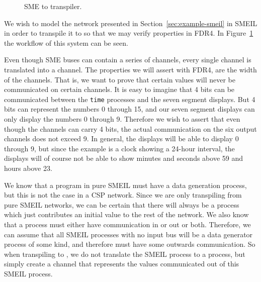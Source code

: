 \begin{figure}[!ht]
  \centering
  \caption{SME to \cspm{} transpiler.}
  \label{fig:sme-to-cspm}
\end{figure}

We wish to model the network presented in Section~\ref{sec:example-smeil} in SMEIL in order to transpile it to \cspm{} so that we may verify properties in FDR4. In Figure~\ref{fig:sme-to-cspm} the workflow of this system can be seen.

Even though SME buses can contain a series of channels, every single channel is translated into a \cspm{} channel. The properties we will assert with FDR4, are the width of the \cspm{} channels. That is, we want to prove that certain values will never be communicated on certain channels.
It is easy to imagine that 4 bits can be communicated between the \texttt{time} processes and the seven segment displays. But 4 bits can represent the numbers 0 through 15, and our seven segment displays can only display the numbers 0 through 9. Therefore we wish to assert that even though the channels can carry 4 bits, the actual communication on the six output channels does not exceed 9. In general, the displays will be able to display 0 through 9, but since the example is a clock showing a 24-hour interval, the displays will of course not be able to show minutes and seconds above 59 and hours above 23.

We know that a program in pure SMEIL must have a data generation process, but this is not the case in a CSP network. Since we are only transpiling from pure SMEIL networks, we can be certain that there will always be a process which just contributes an initial value to the rest of the network.
We also know that a process must either have communication in or out or both.
Therefore, we can assume that all SMEIL processes with no input bus will be a data generator process of some kind, and therefore must have some outwards communication.
So when transpiling to \cspm{}, we do not translate the SMEIL process to a \cspm{} process, but simply create a \cspm{} channel that represents the values communicated out of this SMEIL process.
\\

